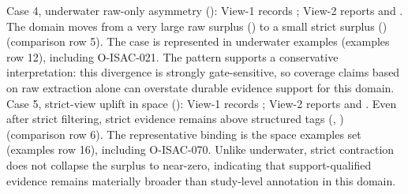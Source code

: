 {}Case 4, underwater raw-only asymmetry (): View-1 records ; View-2 reports  and . The domain moves from a very large raw surplus () to a small strict surplus () (comparison row \markdownRendererHash{}5). The case is represented in underwater  examples (examples row \markdownRendererHash{}12), including  O-ISAC-021. The pattern supports a conservative interpretation: this divergence is strongly gate-sensitive, so coverage claims based on raw extraction alone can overstate durable evidence support for this domain.\markdownRendererParagraphSeparator
{}Case 5, strict-view uplift in space (): View-1 records ; View-2 reports  and . Even after strict filtering, strict evidence remains above structured tags (, ) (comparison row \markdownRendererHash{}6). The representative binding is the space  examples set (examples row \markdownRendererHash{}16), including  O-ISAC-070. Unlike underwater, strict contraction does not collapse the surplus to near-zero, indicating that support-qualified evidence remains materially broader than study-level annotation in this domain.\markdownRendererParagraphSeparator
